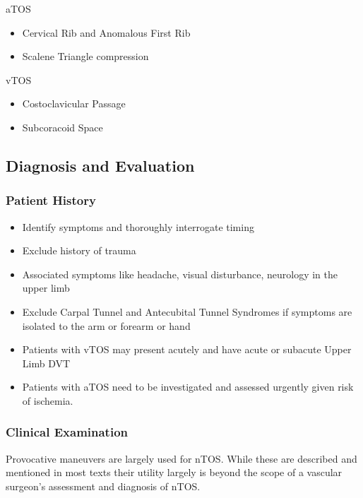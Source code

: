 \documentclass[
]{book}
\begin{document}
aTOS

\begin{itemize}
\item
  Cervical Rib and Anomalous First Rib
\item
  Scalene Triangle compression
\end{itemize}

vTOS

\begin{itemize}
\item
  Costoclavicular Passage
\item
  Subcoracoid Space
\end{itemize}

\hypertarget{diagnosis-and-evaluation}{%
\subsection{Diagnosis and Evaluation}\label{diagnosis-and-evaluation}}

\hypertarget{patient-history}{%
\subsubsection{Patient History}\label{patient-history}}

\begin{itemize}
\item
  Identify symptoms and thoroughly interrogate timing
\item
  Exclude history of trauma
\item
  Associated symptoms like headache, visual disturbance, neurology in
  the upper limb
\item
  Exclude Carpal Tunnel and Antecubital Tunnel Syndromes if symptoms
  are isolated to the arm or forearm or hand
\item
  Patients with vTOS may present acutely and have acute or subacute
  Upper Limb DVT
\item
  Patients with aTOS need to be investigated and assessed urgently
  given risk of ischemia.~
\end{itemize}

\hypertarget{clinical-examination}{%
\subsubsection{Clinical Examination}\label{clinical-examination}}

Provocative maneuvers are largely used for nTOS. While these are
described and mentioned in most texts their utility largely is beyond
the scope of a vascular surgeon's assessment and diagnosis of nTOS.
\end{document}
